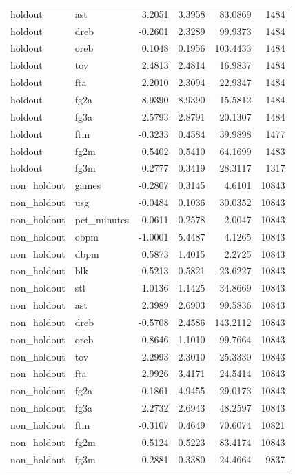 \begin{table}
\begin{tabular}{llrrrr}
holdout & ast & 3.2051 & 3.3958 & 83.0869 & 1484 \\
holdout & dreb & -0.2601 & 2.3289 & 99.9373 & 1484 \\
holdout & oreb & 0.1048 & 0.1956 & 103.4433 & 1484 \\
holdout & tov & 2.4813 & 2.4814 & 16.9837 & 1484 \\
holdout & fta & 2.2010 & 2.3094 & 22.9347 & 1484 \\
holdout & fg2a & 8.9390 & 8.9390 & 15.5812 & 1484 \\
holdout & fg3a & 2.5793 & 2.8791 & 20.1307 & 1484 \\
holdout & ftm & -0.3233 & 0.4584 & 39.9898 & 1477 \\
holdout & fg2m & 0.5402 & 0.5410 & 64.1699 & 1483 \\
holdout & fg3m & 0.2777 & 0.3419 & 28.3117 & 1317 \\
non\_holdout & games & -0.2807 & 0.3145 & 4.6101 & 10843 \\
non\_holdout & usg & -0.0484 & 0.1036 & 30.0352 & 10843 \\
non\_holdout & pct\_minutes & -0.0611 & 0.2578 & 2.0047 & 10843 \\
non\_holdout & obpm & -1.0001 & 5.4487 & 4.1265 & 10843 \\
non\_holdout & dbpm & 0.5873 & 1.4015 & 2.2725 & 10843 \\
non\_holdout & blk & 0.5213 & 0.5821 & 23.6227 & 10843 \\
non\_holdout & stl & 1.0136 & 1.1425 & 34.8669 & 10843 \\
non\_holdout & ast & 2.3989 & 2.6903 & 99.5836 & 10843 \\
non\_holdout & dreb & -0.5708 & 2.4586 & 143.2112 & 10843 \\
non\_holdout & oreb & 0.8646 & 1.1010 & 99.7664 & 10843 \\
non\_holdout & tov & 2.2993 & 2.3010 & 25.3330 & 10843 \\
non\_holdout & fta & 2.9926 & 3.4171 & 24.5414 & 10843 \\
non\_holdout & fg2a & -0.1861 & 4.9455 & 29.0173 & 10843 \\
non\_holdout & fg3a & 2.2732 & 2.6943 & 48.2597 & 10843 \\
non\_holdout & ftm & -0.3107 & 0.4649 & 70.6074 & 10821 \\
non\_holdout & fg2m & 0.5124 & 0.5223 & 83.4174 & 10843 \\
non\_holdout & fg3m & 0.2881 & 0.3380 & 24.4664 & 9837 \\
\bottomrule
\end{tabular}
\end{table}
